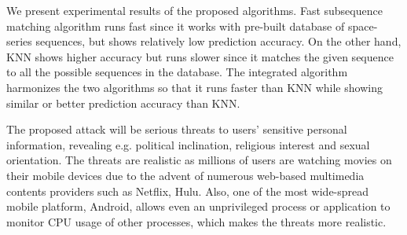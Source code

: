 We present experimental results of the proposed algorithms. Fast subsequence matching algorithm runs fast since it works with pre-built database of space-series sequences, but shows relatively low prediction accuracy.  On the other hand, KNN shows higher accuracy but runs slower since it matches the given sequence to all the possible sequences in the database.  The integrated algorithm harmonizes the two algorithms so that it runs faster than KNN while showing similar or better prediction accuracy than KNN. 

The proposed attack will be serious threats to users' sensitive personal information, revealing e.g. political inclination, religious interest and sexual orientation. The threats are realistic as millions of users are watching movies on their mobile devices due to the advent of numerous web-based multimedia contents providers such as Netflix, Hulu. Also, one of the most wide-spread mobile platform, Android, allows even an unprivileged process or application to monitor CPU usage of other processes, which makes the threats more realistic. 